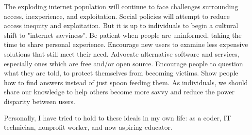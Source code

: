 
The exploding internet population will continue to face challenges
surrounding access, inexperience, and exploitation. Social policies
will attempt to reduce access inequity and exploitation. But it is up
to individuals to begin a cultural shift to "internet savviness". Be
patient when people are uninformed, taking the time to share personal
experience. Encourage new users to examine less expensive solutions
that still meet their need. Advocate alternative software and services,
especially ones which are free and/or open source. Encourage people
to question what they are told, to protect themselves from becoming
victims. Show people how to find answers instead of just spoon feeding
them. As individuals, we should share our knowledge to help others
become more savvy and reduce the power disparity between users.

Personally, I have tried to hold to these ideals in my own life: as a
coder, IT technician, nonprofit worker, and now aspiring educator.
